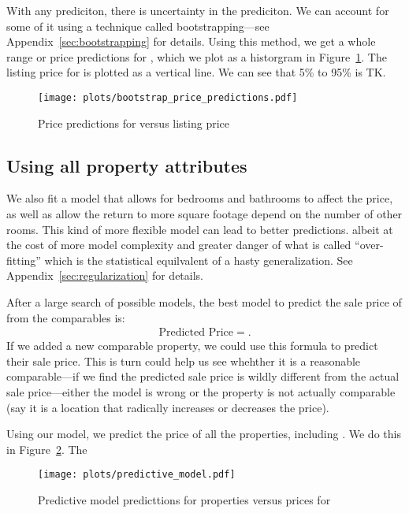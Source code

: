 \documentclass[
12pt, %
letterpaper, %
oneside, %
headinclude,footinclude, %
BCOR5mm, %
]{scrartcl}
\begin{document}
With any prediciton, there is uncertainty in the prediciton.
We can account for some of it using a technique called bootstrapping---see Appendix~\ref{sec:bootstrapping} for details. 
Using this method, we get a whole range or price predictions for \PropertyName{}, which we plot as a historgram in Figure~\ref{fig:bootstrap_price_predictions}.
The listing price for \PropertyName{} is plotted as a vertical line. 
We can see that 5\% to 95\% is TK.

\begin{figure}
\centering
\caption{Price predictions for \PropertyName{} versus listing price} \label{fig:bootstrap_price_predictions}  
\texttt{[image: plots/bootstrap\_price\_predictions.pdf]} 
\end{figure}

\subsection{Using all property attributes}
We also fit a model that allows for bedrooms and bathrooms to affect the price, as well as allow the return to more square footage depend on the number of other rooms.
This kind of more flexible model can lead to better predictions. albeit at the cost of more model complexity and greater danger of what is called ``over-fitting'' which is the statistical equilvalent of a hasty generalization.
See Appendix~\ref{sec:regularization} for details. 

After a large search of possible models, the best model to predict the sale price of \PropertyName{} from the comparables is: 
\begin{align}
\mbox{Predicted Price} = .
\end{align}
If we added a new comparable property, we could use this formula to predict their sale price.
This is turn could help us see whehther it is a reasonable comparable---if we find the predicted sale price is wildly different from the actual sale price---either the model is wrong or the property is not actually comparable (say it is a location that radically increases or decreases the price). 

Using our model, we predict the price of all the properties, including \PropertyName{}.
We do this in Figure~\ref{fig:predictive_model}.
The 

\begin{figure}
\centering
\caption{Predictive model predicttions for properties versus prices for \PropertyName{}} \label{fig:predictive_model}  
\texttt{[image: plots/predictive\_model.pdf]} 
\end{figure}
\end{document}
